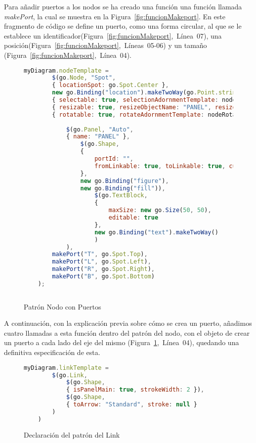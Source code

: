 Para añadir puertos a los nodos se ha creado una función una función llamada \emph{makePort}, la cual se muestra en la Figura~\ref{fig:funcionMakeport}. En este fragmento de código se define un puerto, como una forma circular, al que se le establece un identificador(Figura~\ref{fig:funcionMakeport},~Línea~07), una posición(Figura~\ref{fig:funcionMakeport},~Líneas~05-06) y un tamaño (Figura~\ref{fig:funcionMakeport},~Línea~04).



\begin{figure}[!tb]
	\centering
	\begin{lstlisting}[language=JavaScript]
	myDiagram.nodeTemplate =
		$(go.Node, "Spot",
		{ locationSpot: go.Spot.Center },
		new go.Binding("location").makeTwoWay(go.Point.stringify),
		{ selectable: true, selectionAdornmentTemplate: nodeSelectionAdornmentTemplate },
		{ resizable: true, resizeObjectName: "PANEL", resizeAdornmentTemplate: nodeResizeAdornmentTemplate },
		{ rotatable: true, rotateAdornmentTemplate: nodeRotateAdornmentTemplate },
		
			$(go.Panel, "Auto",
			{ name: "PANEL" },
				$(go.Shape,  
				{
					portId: "", 
					fromLinkable: true, toLinkable: true, cursor: "pointer",
				},
				new go.Binding("figure"),
				new go.Binding("fill")),
					$(go.TextBlock,
					{
						maxSize: new go.Size(50, 50),
						editable: true
					},
					new go.Binding("text").makeTwoWay()
					)
			),
		makePort("T", go.Spot.Top),
		makePort("L", go.Spot.Left),
		makePort("R", go.Spot.Right),
		makePort("B", go.Spot.Bottom)
	);
	
	\end{lstlisting}
	\caption{Patrón Nodo con Puertos}
	\label{fig:patronNodoFinal}
\end{figure}


A continuación, con la explicación previa sobre cómo se crea un puerto,  añadimos cuatro llamadas a esta función dentro del patrón del nodo, con el objeto de crear un puerto a cada lado del eje del mismo (Figura~\ref{fig:patronNodoFinal},~Línea~04), quedando una definitiva especificación de esta.


\begin{figure}[!tb]
	\centering
	\begin{lstlisting}[language=JavaScript]
	myDiagram.linkTemplate =
		$(go.Link, 
			$(go.Shape,  
			{ isPanelMain: true, strokeWidth: 2 }),
			$(go.Shape,  
			{ toArrow: "Standard", stroke: null }
		)
	)
	\end{lstlisting}
\caption{Declaración del patrón del Link}
\label{fig:patronlink}
\end{figure}

